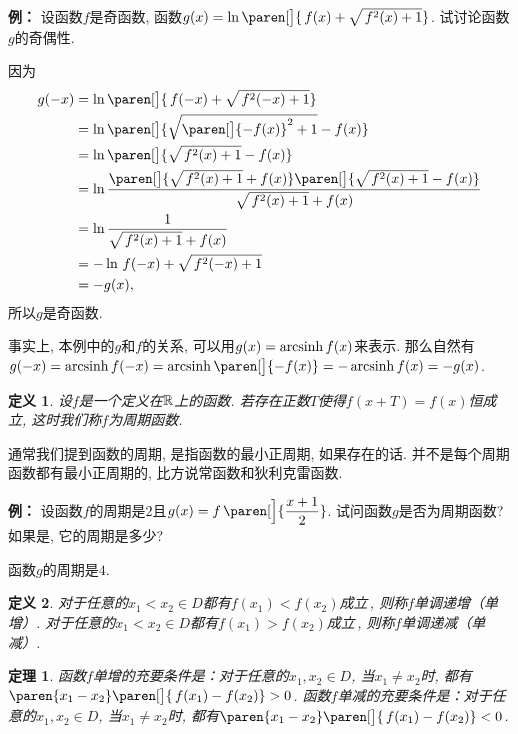 \documentclass[a4paper,punct=CCT]{ctexbook}
\theoremstyle{break}
\newtheorem*{theorem*}{定理}
\newtheorem*{definition*}{定义}
\newenvironment{example}[1][]{\noindent\textbf{例#1：}}{}
\begin{document}
\begin{example}
  设函数\(f\)是奇函数, 函数\(g(x) = \ln\paren[\big]{\,f(x) + \sqrt{\,f^2(x)+1}}\).  试讨论函数\(g\)的奇偶性.

  因为
  \[
    \begin{split}
      g(-x)
      &= \ln\paren[\big]{\,f(-x) + \sqrt{\,f^2(-x)+1}} \\
      &= \ln\paren[\big]{\sqrt{\paren[\big]{-f(x)}^2+1} - f(x)} \\
      &= \ln\paren[\big]{\sqrt{\,f^2(x)+1} - f(x)} \\
      &= \ln{\frac{\paren[\big]{\sqrt{\,f^2(x)+1} + f(x)}\paren[\big]{\sqrt{\,f^2(x)+1} - f(x)}}{\sqrt{\,f^2(x)+1} + f(x)}} \\
      &= \ln \frac1{\sqrt{\,f^2(x)+1} + f(x)} \\
      &= -\ln{\,f(-x) + \sqrt{\,f^2(-x)+1}} \\
      &= -g(x),
    \end{split}
  \]
  所以\(g\)是奇函数.

  事实上, 本例中的\(g\)和\(f\)的关系, 可以用\(g(x) = \operatorname{arcsinh} f(x)\)来表示.  那么自然有\(g(-x) = \arcsinh f(-x) = \arcsinh\paren[\big]{-f(x)} = - \arcsinh f(x) = -g(x)\).
\end{example}

\begin{definition*}
  设\(f\)是一个定义在\(\mathbb{R}\)上的函数.  若存在正数\(T\)使得\(f(x+T) = f(x)\)恒成立, 这时我们称\(f\)为周期函数.
\end{definition*}

通常我们提到函数的周期, 是指函数的最小正周期, 如果存在的话.  并不是每个周期函数都有最小正周期的, 比方说常函数和狄利克雷函数.

\begin{example}
  设函数\(f\)的周期是\(2\)且\(g(x) = f\,\paren[\Big]{\dfrac{x+1}{2}}\).  试问函数\(g\)是否为周期函数?  如果是, 它的周期是多少?

  函数\(g\)的周期是\(4\).
\end{example}

\begin{definition*}
  对于任意的\(x_1 < x_2 \in D\)都有\(f(x_1) < f(x_2)\)成立\,, 则称\(f\)单调递增（单增）.  对于任意的\(x_1 < x_2 \in D\)都有\(f(x_1) > f(x_2)\)成立\,, 则称\(f\)单调递减（单减）.
\end{definition*}

\begin{theorem*}
  函数\(f\)单增的充要条件是：对于任意的\(x_1, x_2 \in D\), 当\(x_1 \ne x_2\)时, 都有\(\paren{x_1 - x_2}\paren[\big]{\,f(x_1) - f(x_2)} > 0\).
  函数\(f\)单减的充要条件是：对于任意的\(x_1, x_2 \in D\), 当\(x_1 \ne x_2\)时, 都有\(\paren{x_1 - x_2}\paren[\big]{\,f(x_1) - f(x_2)} < 0\).
\end{theorem*}
\end{document}
